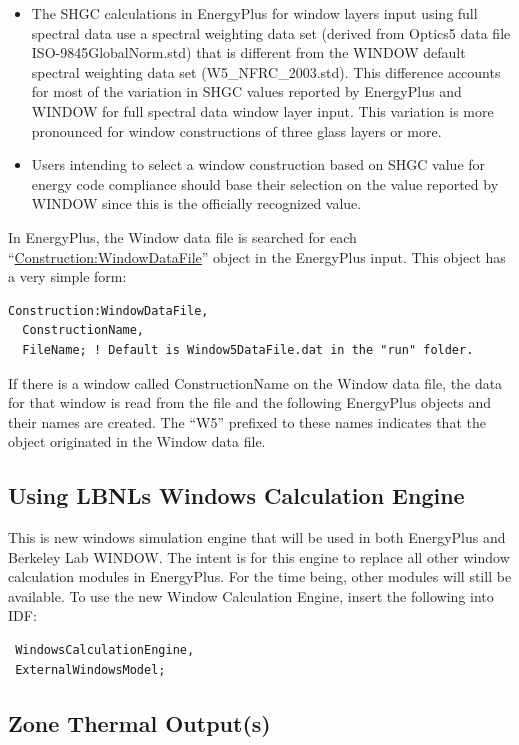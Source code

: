 \begin{itemize}
\item
  The SHGC calculations in EnergyPlus for window layers input using full spectral data use a spectral weighting data set (derived from Optics5 data file ISO-9845GlobalNorm.std) that is different from the WINDOW default spectral weighting data set (W5\_NFRC\_2003.std). This difference accounts for most of the variation in SHGC values reported by EnergyPlus and WINDOW for full spectral data window layer input. This variation is more pronounced for window constructions of three glass layers or more.
\item
  Users intending to select a window construction based on SHGC value for energy code compliance should base their selection on the value reported by WINDOW since this is the officially recognized value.
\end{itemize}

In EnergyPlus, the Window data file is searched for each ``\hyperref[constructionwindowdatafile]{Construction:WindowDataFile}'' object in the EnergyPlus input. This object has a very simple form:

\begin{lstlisting}
Construction:WindowDataFile,
  ConstructionName,
  FileName; ! Default is Window5DataFile.dat in the "run" folder.
\end{lstlisting}

If there is a window called ConstructionName on the Window data file, the data for that window is read from the file and the following EnergyPlus objects and their names are created. The ``W5'' prefixed to these names indicates that the object originated in the Window data file.

\subsection{Using LBNLs Windows Calculation Engine}\label{windowscalculationengine}
This is new windows simulation engine that will be used in both EnergyPlus and Berkeley Lab WINDOW. The intent is for this engine to replace all other window calculation modules in EnergyPlus. For the time being, other modules will still be available. To use the new Window Calculation Engine, insert the following into IDF:

 \begin{lstlisting}
 WindowsCalculationEngine,
 ExternalWindowsModel;
 \end{lstlisting}

\subsection{Zone Thermal Output(s)}\label{zone-thermal-outputs-1}


